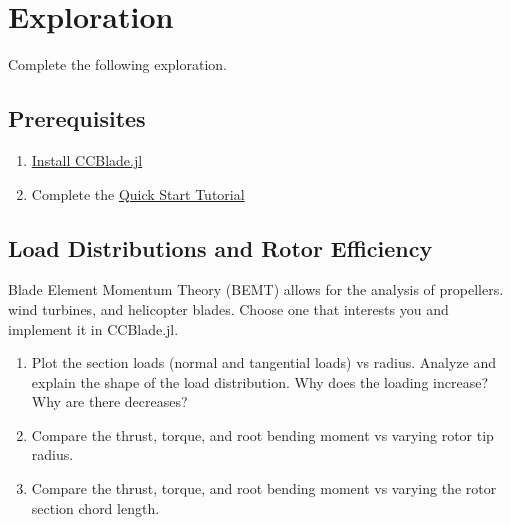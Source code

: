 \documentclass[11pt,twocolumn]{article}
\begin{document}
\section{Exploration}
\label{sec:exploration}

Complete the following exploration.

\subsection{Prerequisites}
\label{ssec:prereqs}

\begin{enumerate}[label=\roman*.]
	\item \href{https://flow.byu.edu/CCBlade.jl/stable/}{Install CCBlade.jl}
	\item Complete the \href{https://flow.byu.edu/CCBlade.jl/stable/tutorial/}{Quick Start Tutorial}
\end{enumerate}


\subsection{Load Distributions and Rotor Efficiency}

Blade Element Momentum Theory (BEMT) allows for the analysis of propellers. wind turbines, and helicopter blades. 
Choose one that interests you and implement it in CCBlade.jl.

\begin{enumerate}[label=\roman*.]
	\item Plot the section loads (normal and tangential loads) vs radius. Analyze and explain the shape of the load distribution. Why does the loading increase? Why are there decreases? 
	\item Compare the thrust, torque, and root bending moment vs varying rotor tip radius.
	\item Compare the thrust, torque, and root bending moment vs varying the rotor section chord length.
\end{enumerate}
\end{document}
